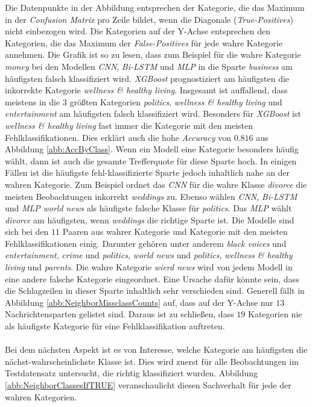 \documentclass[a4paper,11pt]{article}
\begin{document}
Die Datenpunkte in der Abbildung entsprechen der Kategorie, die das Maximum in der \textit{Confusion Matrix} pro Zeile bildet, wenn die Diagonale (\textit{True-Positives}) nicht einbezogen wird. Die Kategorien auf der Y-Achse entsprechen den Kategorien, die das Maximum der \textit{False-Positives} für jede wahre Kategorie annehmen. Die Grafik ist so zu lesen, dass zum Beispiel für die wahre Kategorie \textit{money} bei den Modellen \textit{CNN}, \textit{Bi-LSTM} und \textit{MLP} in die Sparte \textit{business} am häufigsten falsch klassifiziert wird. \textit{XGBoost} prognostiziert am häufigsten die inkorrekte Kategorie \textit{wellness \& healthy living}. Insgesamt ist auffallend, dass meistens in die $3$ größten Kategorien \textit{politics}, \textit{wellness \& healthy living} und \textit{entertainment} am häufigsten falsch klassifiziert wird. Besonders für \textit{XGBoost} ist \textit{wellness \& healthy living} fast immer die Kategorie mit den meisten Fehlklassifikationen. Dies erklärt auch die hohe \textit{Accuracy} von $0.816$ aus Abbildung \ref{abb:AccByClass}. Wenn ein Modell eine Kategorie besonders häufig wählt, dann ist auch die gesamte Trefferquote für diese Sparte hoch. In einigen Fällen ist die häufigste fehl-klassifizierte Sparte jedoch inhaltlich nahe an der wahren Kategorie. Zum Beispiel ordnet das \textit{CNN} für die wahre Klasse \textit{divorce} die meisten Beobachtungen inkorrekt \textit{weddings} zu. Ebenso wählen \textit{CNN}, \textit{Bi-LSTM} und \textit{MLP} \textit{world news} als häufigste falsche Klasse für \textit{politics}. Das \textit{MLP} wählt \textit{divorce} am häufigsten, wenn \textit{weddings} die richtige Sparte ist. Die Modelle sind sich bei den $11$ Paaren aus wahrer Kategorie und Kategorie mit den meisten Fehlklassifikationen einig. Darunter gehören unter anderem \textit{black voices} und \textit{entertainment}, \textit{crime} und \textit{politics}, \textit{world news} und \textit{politics}, \textit{wellness \& healthy living} und \textit{parents}. Die wahre Kategorie \textit{wierd news} wird von jedem Modell in eine andere falsche Kategorie eingeordnet. Eine Ursache dafür könnte sein, dass die Schlagzeilen in dieser Sparte inhaltlich sehr verschieden sind. Generell fällt in Abbildung \ref{abb:NeighborMissclassCounts} auf, dass auf der Y-Achse nur $13$ Nachrichtensparten gelistet sind. Daraus ist zu schließen, dass $19$ Kategorien nie als häufigste Kategorie für eine Fehlklassifikation auftreten.\\
\\
Bei dem nächsten Aspekt ist es von Interesse, welche Kategorie am häufigsten die nächst-wahrscheinlichste Klasse ist. Dies wird zuerst für alle Beobachtungen im Testdatensatz untersucht, die richtig klassifiziert wurden. Abbildung \ref{abb:NeighborClassesIfTRUE} veranschaulicht diesen Sachverhalt für jede der wahren Kategorien.
\end{document}
